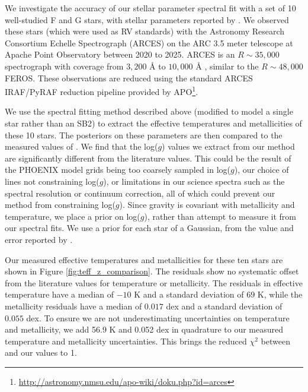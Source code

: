 \documentclass[]{aastex701} %
\begin{document}


\appendix 
\label{append}
We investigate the accuracy of our stellar parameter spectral fit with a set of 10 well-studied F and G stars, with stellar parameters reported by \citet{soubiran:2022}. We observed these stars (which were used as RV standards) with the Astronomy Research Consortium Echelle Spectrograph (ARCES) on the ARC 3.5 meter telescope at Apache Point Observatory between 2020 to 2025. ARCES is an $R \sim 35,000$ spectrograph with coverage from $3,200$ Å to $10,000$ Å \citep{wang:2003}, similar to the $R \sim 48,000$ FEROS. These observations are reduced using the standard ARCES IRAF/PyRAF reduction pipeline provided by APO\footnote{\url{http://astronomy.nmsu.edu/apo-wiki/doku.php?id=arces}}.

We use the spectral fitting method described above (modified to model a single star rather than an SB2) to extract the effective temperatures and metallicities of these 10 stars. The posteriors on these parameters are then compared to the measured values of \citet{soubiran:2022}. We find that the log($g$) values we extract from our method are significantly different from the literature values. This could be the result of the PHOENIX model grids being too coarsely sampled in log($g$), our choice of lines not constraining log($g$), or limitations in our science spectra such as the spectral resolution or continuum correction, all of which could prevent our method from constraining log($g$). Since gravity is covariant with metallicity and temperature, we place a prior on log($g$), rather than attempt to measure it from our spectral fits. We use a prior for each star of a Gaussian, from the value and error reported by \citet{soubiran:2022}.

Our measured effective temperatures and metallicities for these ten stars are shown in Figure \ref{fig:teff_z_comparison}. The residuals show no systematic offset from the literature values for temperature or metallicity. The residuals in effective temperature have a median of $-10$ K and a standard deviation of $69$ K, while the metallicity residuals have a median of $0.017$ dex and a standard deviation of $0.055$ dex. To ensure we are not underestimating uncertainties on temperature and metallicity, we add 56.9 K and 0.052 dex in quadrature to our measured temperature and metallicity uncertainties. This brings the reduced $\chi^2$ between \citet{soubiran:2022} and our values to 1.
\end{document}
